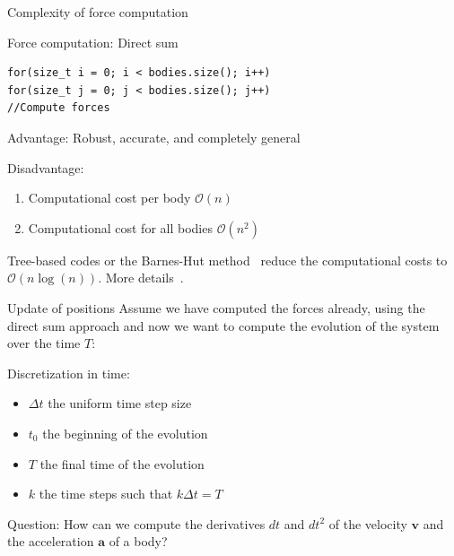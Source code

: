 \documentclass[\classoption]{beamer}
\begin{document}
\begin{frame}[fragile]{Complexity of force computation}

\begin{block}{Force computation: Direct sum}
\begin{lstlisting}
for(size_t i = 0; i < bodies.size(); i++)
for(size_t j = 0; j < bodies.size(); j++)
//Compute forces
\end{lstlisting}
\end{block}

\begin{block}{Advantage:}
Robust, accurate, and completely general
\end{block}

\begin{block}{Disadvantage:}
\begin{enumerate}
\item Computational cost per body $\mathcal{O}(n)$ 
\item Computational cost for all bodies $\mathcal{O}(n^2)$ 
\end{enumerate}
\end{block}
Tree-based codes or the Barnes-Hut method~\cite{barnes1986hierarchical} reduce the computational costs to $\mathcal{O}(n\log(n))$. More details~\cite{knuth1997art}.
\end{frame}

\begin{frame}{Update of positions}
Assume we have computed the forces already, using the direct sum approach and now we want to compute the evolution of the system over the time $T$:
\begin{block}{Discretization in time:}
\begin{itemize}
\item $\Delta t$ the uniform time step size
\item $t_0$ the beginning of the evolution
\item $T$ the final time of the evolution
\item $k$ the time steps such that $k\Delta t=T$
\end{itemize}
\end{block}
Question: How can we compute the derivatives $dt$ and $dt^2$ of the velocity $\mathbf{v}$ and the acceleration $\mathbf{a}$ of a body?
\end{frame}
\end{document}
